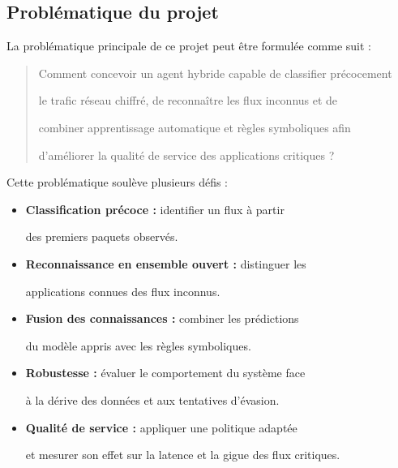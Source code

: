 \subsection{Problématique du projet}



La problématique principale de ce projet peut être formulée comme suit :



\begin{quote}

Comment concevoir un agent hybride capable de classifier précocement

le trafic réseau chiffré, de reconnaître les flux inconnus et de

combiner apprentissage automatique et règles symboliques afin

d'améliorer la qualité de service des applications critiques ?

\end{quote}



Cette problématique soulève plusieurs défis :



\begin{itemize}

    \item \textbf{Classification précoce :} identifier un flux à partir

    des premiers paquets observés.

    \item \textbf{Reconnaissance en ensemble ouvert :} distinguer les

    applications connues des flux inconnus.

    \item \textbf{Fusion des connaissances :} combiner les prédictions

    du modèle appris avec les règles symboliques.

    \item \textbf{Robustesse :} évaluer le comportement du système face

    à la dérive des données et aux tentatives d'évasion.

    \item \textbf{Qualité de service :} appliquer une politique adaptée

    et mesurer son effet sur la latence et la gigue des flux critiques.

\end{itemize}




